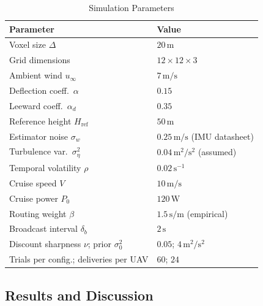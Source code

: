 \documentclass[conference]{IEEEtran}
\newcommand{\rd}[1]{#1}   %
\begin{document}
\begin{table}[!t]
\renewcommand{\arraystretch}{1.0}
\caption{Simulation Parameters}
\label{tab:params}
\centering
\begin{tabular}{ll}
\toprule
\textbf{Parameter} & \textbf{Value} \\
\midrule
Voxel size $\Delta$             & $20\,\text{m}$                                  \\
Grid dimensions                  & $12\times12\times3$                             \\
Ambient wind $u_\infty$          & $7\,\text{m/s}$~\cite{asce}                     \\
Deflection coeff.\ $\alpha$      & $0.15$~\cite{kawamura}                          \\
Leeward coeff.\ $\alpha_d$       & $0.35$~\cite{holmes}                            \\
Reference height $H_\text{ref}$  & $50\,\text{m}$~\cite{holmes}                    \\
Estimator noise $\sigma_w$       & $0.25\,\text{m/s}$ (IMU datasheet)              \\
Turbulence var.\ $\sigma_\eta^2$ & $0.04\,\text{m}^2/\text{s}^2$ (assumed)         \\
Temporal volatility $\rho$       & $0.02$\rd{$\,\text{s}^{-1}$}                    \\
Cruise speed $V$                 & $10\,\text{m/s}$                                \\
Cruise power $P_0$               & $120\,\text{W}$                                 \\
Routing weight $\beta$           & $1.5$\rd{$\,\text{s/m}$ (empirical)} \\
Broadcast interval $\delta_b$    & $2\,\text{s}$                                   \\
\rd{Discount sharpness $\nu$; prior $\sigma_0^2$} & \rd{$0.05$; $4\,\text{m}^2/\text{s}^2$} \\
Trials per config.\rd{; deliveries per UAV} & $60$\rd{; $24$}                                  \\
\bottomrule
\end{tabular}
\end{table}

\subsection{Results and Discussion}
\end{document}

